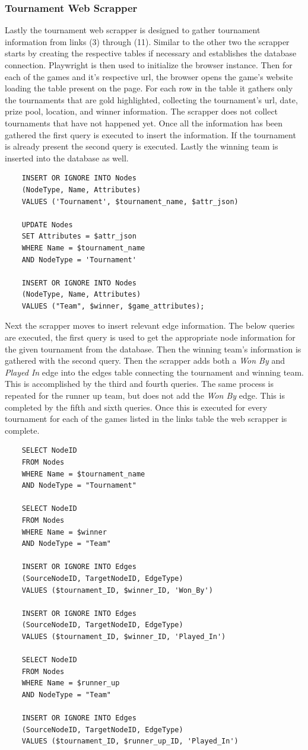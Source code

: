\documentclass[sigconf]{acmart}
\begin{document}
\subsubsection{Tournament Web Scrapper}
Lastly the tournament web scrapper is designed to gather tournament information from links (3) through (11). Similar to the other two the scrapper starts by creating the respective tables if necessary and establishes the database connection. Playwright is then used to initialize the browser instance. Then for each of the games and it's respective url, the browser opens the game's website loading the table present on the page. For each row in the table it gathers only the tournaments that are gold highlighted, collecting the tournament's url, date, prize pool, location, and winner information. The scrapper does not collect tournaments that have not happened yet. Once all the information has been gathered the first query is executed to insert the information. If the tournament is already present the second query is executed. Lastly the winning team is inserted into the database as well.
\begin{verbatim}
    INSERT OR IGNORE INTO Nodes
    (NodeType, Name, Attributes)
    VALUES ('Tournament', $tournament_name, $attr_json)

    UPDATE Nodes
    SET Attributes = $attr_json
    WHERE Name = $tournament_name
    AND NodeType = 'Tournament'
    
    INSERT OR IGNORE INTO Nodes
    (NodeType, Name, Attributes)
    VALUES ("Team", $winner, $game_attributes);
\end{verbatim}
Next the scrapper moves to insert relevant edge information. The below queries are executed, the first query is used to get the appropriate node information for the given tournament from the database. Then the winning team's information is gathered with the second query. Then the scrapper adds both a \textit{Won By} and \textit{Played In} edge into the edges table connecting the tournament and winning team. This is accomplished by the third and fourth queries. The same process is repeated for the runner up team, but does not add the \textit{Won By} edge. This is completed by the fifth and sixth queries. Once this is executed for every tournament for each of the games listed in the links table the web scrapper is complete.
\begin{verbatim}
    SELECT NodeID
    FROM Nodes
    WHERE Name = $tournament_name
    AND NodeType = "Tournament"

    SELECT NodeID
    FROM Nodes
    WHERE Name = $winner
    AND NodeType = "Team"

    INSERT OR IGNORE INTO Edges
    (SourceNodeID, TargetNodeID, EdgeType)
    VALUES ($tournament_ID, $winner_ID, 'Won_By')

    INSERT OR IGNORE INTO Edges
    (SourceNodeID, TargetNodeID, EdgeType)
    VALUES ($tournament_ID, $winner_ID, 'Played_In')
    
    SELECT NodeID
    FROM Nodes
    WHERE Name = $runner_up
    AND NodeType = "Team"

    INSERT OR IGNORE INTO Edges
    (SourceNodeID, TargetNodeID, EdgeType)
    VALUES ($tournament_ID, $runner_up_ID, 'Played_In')
\end{verbatim}
\end{document}
